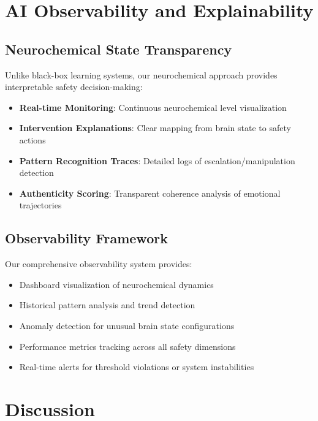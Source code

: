 \documentclass[12pt]{article}
\begin{document}
\section{AI Observability and Explainability}

\subsection{Neurochemical State Transparency}

Unlike black-box learning systems, our neurochemical approach provides interpretable safety decision-making:

\begin{itemize}
\item \textbf{Real-time Monitoring}: Continuous neurochemical level visualization
\item \textbf{Intervention Explanations}: Clear mapping from brain state to safety actions
\item \textbf{Pattern Recognition Traces}: Detailed logs of escalation/manipulation detection
\item \textbf{Authenticity Scoring}: Transparent coherence analysis of emotional trajectories
\end{itemize}

\subsection{Observability Framework}

Our comprehensive observability system provides:

\begin{itemize}
\item Dashboard visualization of neurochemical dynamics
\item Historical pattern analysis and trend detection
\item Anomaly detection for unusual brain state configurations
\item Performance metrics tracking across all safety dimensions
\item Real-time alerts for threshold violations or system instabilities
\end{itemize}



\section{Discussion}
\end{document}
